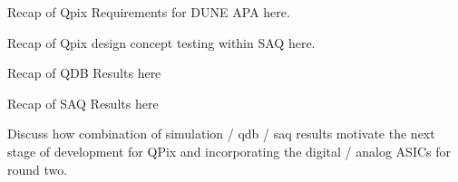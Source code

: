 Recap of Qpix Requirements for DUNE APA here.

Recap of Qpix design concept testing within SAQ here.

Recap of QDB Results here

Recap of SAQ Results here

Discuss how combination of simulation / qdb / saq results motivate the next stage of development for QPix and incorporating the digital / analog ASICs for round two.
